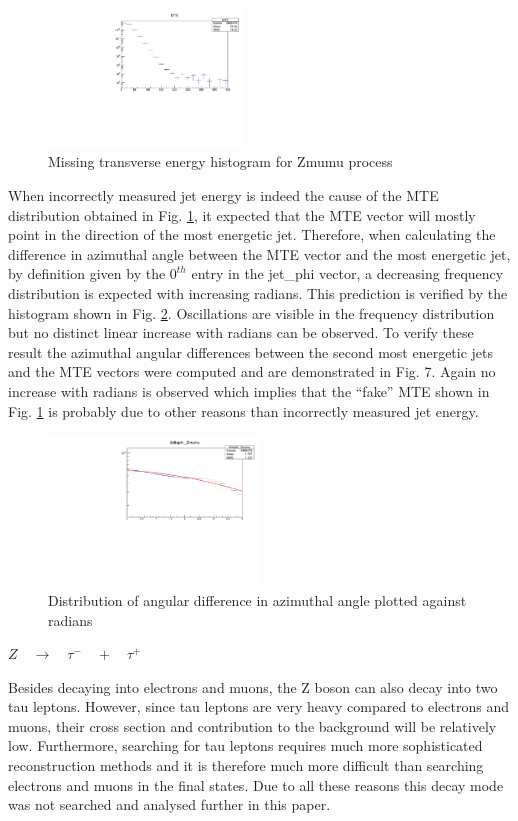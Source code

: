 \documentclass[runningheads,a4paper]{llncs}
\begin{document}
\begin{figure}
\centering
\includegraphics[height=3.7cm]{MTE_Zmumu_new}
\caption{Missing transverse energy histogram for Zmumu process}
\label{fig:mtezmumu}
\end{figure}

When incorrectly measured jet energy is indeed the cause of the MTE distribution obtained in Fig. \ref{fig:mtezmumu}, it expected that the MTE vector will mostly point in the  direction of the most energetic jet. Therefore, when calculating the difference in azimuthal angle between the MTE vector and the most energetic jet, by definition given by the ${0}^{th}$ entry in the jet\_phi vector, a decreasing frequency distribution is expected with increasing radians. This prediction is verified by the histogram shown in Fig. \ref{fig:deltaphizmumu}. Oscillations are visible in the frequency distribution but no distinct linear increase with radians can be observed. To verify these result the azimuthal angular differences between the second most energetic jets and the MTE vectors were computed and are demonstrated in Fig. 7. Again no increase with radians is observed which implies that the “fake” MTE shown in Fig. \ref{fig:mtezmumu} is probably due to other reasons than incorrectly measured jet energy.

\begin{figure}
\centering
\includegraphics[height=4cm]{deltaphi_jet0_met_Zmumu_fit}
\caption{Distribution of angular difference in azimuthal angle plotted against radians}
\label{fig:deltaphizmumu}
\end{figure}
\bigbreak
$Z\quad \rightarrow \quad \tau ^{ - }\quad +\quad { \tau  }^{ + }$

Besides decaying into electrons and muons, the Z boson can also decay into two tau leptons. However, since tau leptons are very heavy compared to electrons and muons, their cross section and contribution to the background will be relatively low. Furthermore, searching for tau leptons requires much more sophisticated reconstruction methods and it is therefore much more difficult than searching electrons and muons in the final states. Due to all these reasons this decay mode was not searched and analysed further in this paper.
\end{document}
